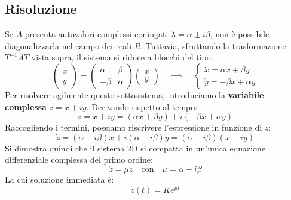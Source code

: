 \documentclass[openany]{book}
\theoremstyle{definition}
\theoremstyle{remark}
\begin{document}
\subsection*{Risoluzione}
Se $A$ presenta autovalori complessi coniugati $ \lambda = \alpha \pm i \beta$, non è possibile diagonalizzarla nel campo dei reali $R$. Tuttavia, sfruttando la trasformazione $T^{-1}AT$ vista sopra, il sistema si riduce a blocchi del tipo:
\begin{equation}
    \begin{pmatrix} \dot{x} \\ \dot{y} \end{pmatrix} 
    = \begin{pmatrix} \alpha & \beta \\ -\beta & \alpha \end{pmatrix} 
    \begin{pmatrix} x \\ y \end{pmatrix}
    \quad \implies \quad
    \begin{cases}
        \dot{x} = \alpha x + \beta y \\
        \dot{y} = -\beta x + \alpha y
    \end{cases}
\end{equation}
Per risolvere agilmente questo sottosistema, introduciamo la \textbf{variabile complessa} $z = x + iy$. Derivando rispetto al tempo:
\begin{equation}
    \dot{z} = \dot{x} + i\dot{y} = (\alpha x + \beta y) + i(-\beta x + \alpha y)
\end{equation}
Raccogliendo i termini, possiamo riscrivere l'espressione in funzione di $z$:
\begin{equation}
    \dot{z} = (\alpha - i\beta)x + i(\alpha - i\beta)y = (\alpha - i\beta)(x + iy)
\end{equation}
Si dimostra quindi che il sistema 2D si compatta in un'unica equazione differenziale complessa del primo ordine:
\begin{equation}
    \dot{z} = \mu z \quad \text{con} \quad \mu = \alpha - i\beta
\end{equation}
La cui soluzione immediata è:
\begin{equation}
    z(t) = K e^{\mu t}
\end{equation}
\end{document}
